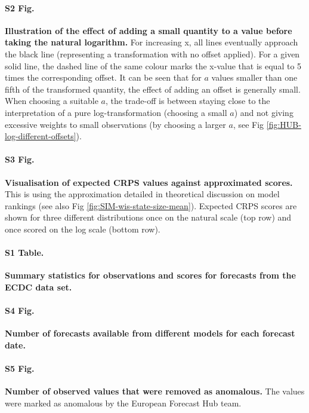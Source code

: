 \documentclass[10pt,letterpaper]{article}
\begin{document}
\paragraph{S2 Fig.}
\label{fig:illustration-effect-log-offset}
\textbf{Illustration of the effect of adding a small quantity to a value before taking the natural logarithm. }
For increasing x, all lines eventually approach the black line (representing a transformation with no offset applied).
    For a given solid line, the dashed line of the same colour marks the x-value that  is equal to 5 times the corresponding offset. It can be seen that for $a$ values smaller than one fifth of the transformed quantity, the effect of adding an offset is generally small. When choosing a suitable $a$, the trade-off is between staying close to the interpretation of a pure log-transformation (choosing a small $a$) and not giving excessive weights to small observations (by choosing a larger $a$, see Fig \ref{fig:HUB-log-different-offsets}).
    
\paragraph{S3 Fig.}
\label{fig:score-approx}
\textbf{Visualisation of expected CRPS values against approximated scores.} 
This is using the approximation detailed in theoretical discussion on model rankings (see also Fig \ref{fig:SIM-wis-state-size-mean}). Expected CRPS scores are shown for three different distributions once on the natural scale (top row) and once scored on the log scale (bottom row). 

\paragraph{S1 Table.}
\label{tab:HUB-summary}
\textbf{Summary statistics for observations and scores for forecasts from the ECDC data set.}

\paragraph{S4 Fig.}
\label{fig:HUB-num-avail-models}
\textbf{Number of forecasts available from different models for each forecast date.}
    
\paragraph{S5 Fig.}
\label{fig:number-anomalies}
\textbf{Number of observed values that were removed as anomalous. }
The values were marked as anomalous by the European Forecast Hub team. 
    
\end{document}
